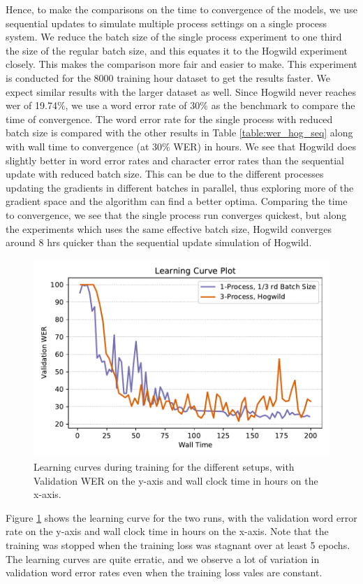 Hence, to make the comparisons on the time to convergence of the models, we use sequential updates to simulate multiple process settings on a single process system. We reduce the batch size of the single process experiment to one third the size of the regular batch size, and this equates it to the Hogwild experiment closely. This makes the comparison more fair and easier to make. This experiment is conducted for the 8000 training hour dataset to get the results faster.  We expect similar results with the larger dataset as well. Since Hogwild never reaches \acrshort{wer} of 19.74\%, we use a word error rate of 30\% as the benchmark to compare the time of convergence. The word error rate for the single process with reduced batch size is compared with the other results in Table \ref{table:wer_hog_seq} along with  wall time to convergence (at 30\% WER) in hours. We see that Hogwild does slightly better in word error rates and character error rates than the sequential update with reduced batch size. This can be due to the different processes updating the gradients in different batches in parallel, thus exploring more of the gradient space and the algorithm can find a better optima. Comparing the time to convergence, we see that the single process run converges quickest, but along the experiments which uses the same effective batch size, Hogwild converges around 8 hrs quicker than the sequential update simulation of Hogwild. 

\begin{figure}[ht]
  \begin{center}
    \includegraphics[width=\textwidth]{images/learning_curve_8000_hogwild.pdf} 
    \caption{Learning curves during training for the different setups, with Validation WER on the y-axis and wall clock time in hours on the x-axis.}
    \label{fig:learningcurve_async}
  \end{center}
\end{figure}

Figure \ref{fig:learningcurve_async} shows the learning curve for the two runs, with the validation word error rate on the y-axis and wall clock time in hours on the x-axis. Note that the training was stopped when the training loss was stagnant over at least 5 epochs. The learning curves are quite erratic, and we observe a lot of variation in validation word error rates even when the training loss vales are constant. 
